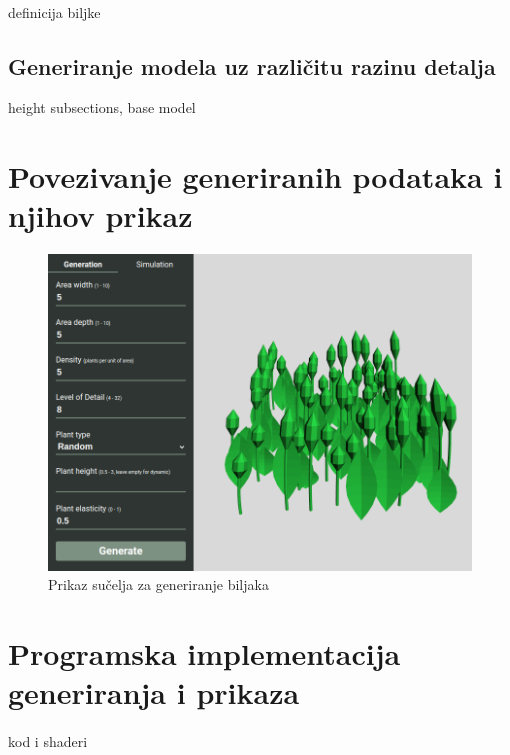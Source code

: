 \documentclass[times, utf8, diplomski]{fer}
\begin{document}
\paragraph{}
definicija biljke

\paragraph{}


\subsection{Generiranje modela uz različitu razinu detalja}
height subsections, base model

\section{Povezivanje generiranih podataka i njihov prikaz}
\begin{figure}[h]
	\centering
	\includegraphics[width=1\textwidth]{img/21-5}
	\caption{Prikaz sučelja za generiranje biljaka}
	\label{fig:21-5}
\end{figure}

\section{Programska implementacija generiranja i prikaza}
\paragraph{}
kod i shaderi
\end{document}
